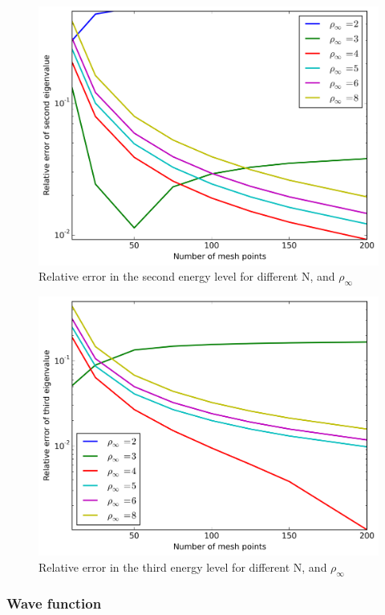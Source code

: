 \documentclass[11pt,a4paper,english,draft]{article}
\numberwithin{equation}{section}
\newcommand{\figurewidth}{.85\textwidth}
\begin{document}
\begin{figure}
\centering
\includegraphics[width=\figurewidth]{../results/rel_logE1.png}
\caption{Relative error in the second energy level for different N,
and $\rho_\infty$}
\label{fig:relE1}
\end{figure}

\begin{figure}
\centering
\includegraphics[width=\figurewidth]{../results/rel_logE2.png}
\caption{Relative error in the third energy level for different N,
and $\rho_\infty$}
\label{fig:relE2}
\end{figure}

\subsubsection{Wave function}
\end{document}
